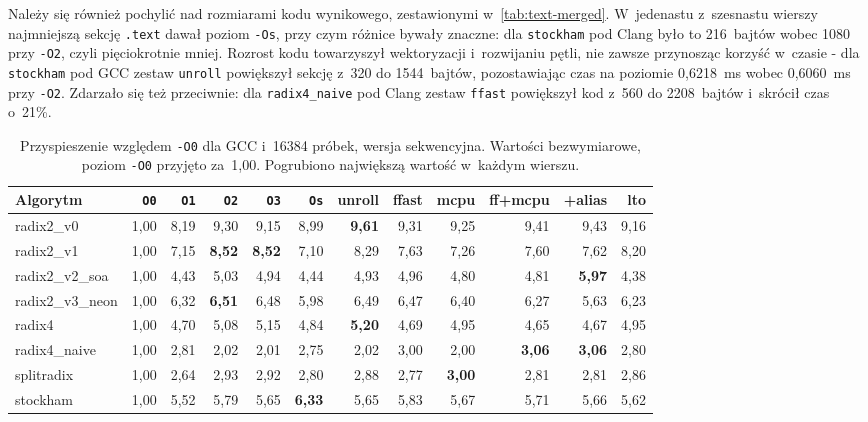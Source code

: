 Należy się również pochylić nad rozmiarami kodu wynikowego, zestawionymi
w~\cref{tab:text-merged}. W~jedenastu z~szesnastu wierszy najmniejszą sekcję
\texttt{.text} dawał poziom \texttt{-Os}, przy czym różnice bywały znaczne:
dla \texttt{stockham} pod Clang było to 216~bajtów wobec 1080 przy \texttt{-O2},
czyli pięciokrotnie mniej. Rozrost kodu towarzyszył wektoryzacji i~rozwijaniu
pętli, nie zawsze przynosząc korzyść w~czasie - dla \texttt{stockham} pod GCC
zestaw \texttt{unroll} powiększył sekcję z~320 do 1544~bajtów, pozostawiając czas
na poziomie 0,6218~ms wobec 0,6060~ms przy \texttt{-O2}. Zdarzało się też
przeciwnie: dla \texttt{radix4\_naive} pod Clang zestaw \texttt{ffast} powiększył
kod z~560 do 2208~bajtów i~skrócił czas o~21\%.
\begin{table}[H]
\centering
\caption{Przyspieszenie względem \texttt{-O0} dla GCC i~16384 próbek, wersja sekwencyjna. Wartości bezwymiarowe, poziom \texttt{-O0} przyjęto za~1,00. Pogrubiono największą wartość w~każdym wierszu.}
\label{tab:speedup-gcc-16k}
\scriptsize
\setlength{\tabcolsep}{3.0pt}
\begin{tabular}{lrrrrrrrrrrr}
\toprule
Algorytm & \texttt{O0} & \texttt{O1} & \texttt{O2} & \texttt{O3} & \texttt{Os} & unroll & ffast & mcpu & ff+mcpu & +alias & lto \\
\midrule
radix2\_v0 & 1,00 & 8,19 & 9,30 & 9,15 & 8,99 & \textbf{9,61} & 9,31 & 9,25 & 9,41 & 9,43 & 9,16 \\
radix2\_v1 & 1,00 & 7,15 & \textbf{8,52} & \textbf{8,52} & 7,10 & 8,29 & 7,63 & 7,26 & 7,60 & 7,62 & 8,20 \\
radix2\_v2\_soa & 1,00 & 4,43 & 5,03 & 4,94 & 4,44 & 4,93 & 4,96 & 4,80 & 4,81 & \textbf{5,97} & 4,38 \\
radix2\_v3\_neon & 1,00 & 6,32 & \textbf{6,51} & 6,48 & 5,98 & 6,49 & 6,47 & 6,40 & 6,27 & 5,63 & 6,23 \\
radix4 & 1,00 & 4,70 & 5,08 & 5,15 & 4,84 & \textbf{5,20} & 4,69 & 4,95 & 4,65 & 4,67 & 4,95 \\
radix4\_naive & 1,00 & 2,81 & 2,02 & 2,01 & 2,75 & 2,02 & 3,00 & 2,00 & \textbf{3,06} & \textbf{3,06} & 2,80 \\
splitradix & 1,00 & 2,64 & 2,93 & 2,92 & 2,80 & 2,88 & 2,77 & \textbf{3,00} & 2,81 & 2,81 & 2,86 \\
stockham & 1,00 & 5,52 & 5,79 & 5,65 & \textbf{6,33} & 5,65 & 5,83 & 5,67 & 5,71 & 5,66 & 5,62 \\
\bottomrule
\end{tabular}
\end{table}

